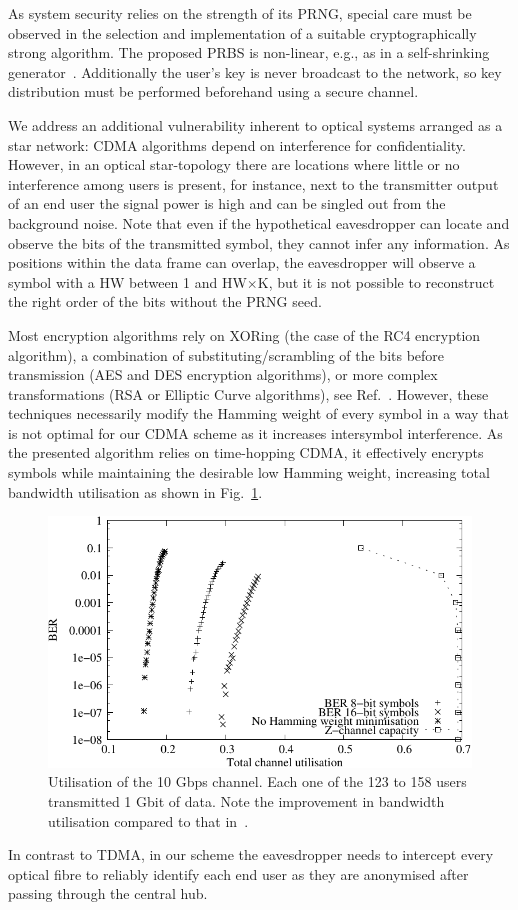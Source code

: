 As system security relies on the strength of its PRNG, special care must be observed in the selection and implementation of a suitable cryptographically strong algorithm.
The proposed PRBS is non-linear, e.g., as in a self-shrinking generator~\cite{Meier:94}.
Additionally the user's key is never broadcast to the network, so key distribution must be performed beforehand using a secure channel.

We address an additional vulnerability inherent to optical systems arranged as a star network: CDMA algorithms depend on interference for confidentiality.
However, in an optical star-topology there are locations where little or no interference among users is present, for instance, next to the transmitter output of an end user the signal power is high and can be singled out from the background noise.
Note that even if the hypothetical eavesdropper can locate and observe the bits of the transmitted symbol, they cannot infer any information.
As positions within the data frame can overlap, the eavesdropper will observe a symbol with a HW between 1 and HW$\times$K, but it is not possible to reconstruct the right order of the bits without the PRNG seed.

Most encryption algorithms rely on XORing (the case of the RC4 encryption algorithm), a combination of substituting/scrambling of the bits before transmission (AES and DES encryption algorithms), or more complex transformations (RSA or Elliptic Curve algorithms), see Ref.~\cite{Menezes:1996:HAC:548089}.
However, these techniques necessarily modify the Hamming weight of every symbol in a way that is not optimal for our CDMA scheme as it increases intersymbol interference.
As the presented algorithm relies on time-hopping CDMA, it effectively encrypts symbols while maintaining the desirable low Hamming weight, increasing total bandwidth utilisation as shown in Fig.~\ref{fig_use}.

\begin{figure}[t]
  \centering
  \includegraphics[width=0.48 \textwidth]{BERvsChannel} 
  \caption{Utilisation of the 10 Gbps channel. Each one of the 123 to 158 users transmitted 1 Gbit of data. Note the improvement in bandwidth utilisation compared to that in~\cite{ortega11}.}
  \label{fig_use}
\end{figure}

In contrast to TDMA, in our scheme the eavesdropper needs to intercept every optical fibre to reliably identify each end user as they are anonymised after passing through the central hub.
